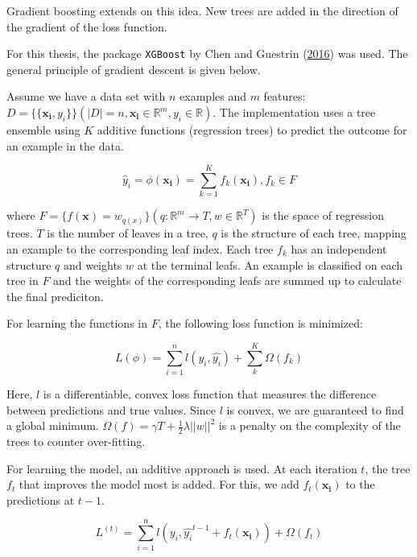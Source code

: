 \documentclass[
  11pt,
  a4paper,
  DIV=12,captions=tableheading,oneside]{scrbook}
\begin{document}
Gradient boosting extends on this idea. New trees are added in the direction of the gradient of the loss function.

For this thesis, the package \texttt{XGBoost} by Chen and Guestrin (\protect\hyperlink{ref-chen2016xgboost}{2016}) was used. The general principle of gradient descent is given below.

Assume we have a data set with \(n\) examples and \(m\) features: \(D = \{\{\mathbf{x_i}, y_i\}\} ( |D| = n, \mathbf{x_i} \in \mathbb{R}^m, y_i \in \mathbb{R})\). The implementation uses a tree ensemble using \(K\) additive functions (regression trees) to predict the outcome for an example in the data.

\begin{equation}
\hat{y}_i = \phi(\mathbf{x_i}) = \sum_{k=1}^K f_k(\mathbf{x_i}), f_k \in F
\label{eq:gbm-ensemble}
\end{equation}

where \(F = \{f(\mathbf{x}) = w_{q(x)}\} (q: \mathbb{R}^m \rightarrow T, w \in \mathbb{R}^T)\) is the space of regression trees. \(T\) is the number of leaves in a tree, \(q\) is the structure of each tree, mapping an example to the corresponding leaf index. Each tree \(f_k\) has an independent structure \(q\) and weights \(w\) at the terminal leafs. An example is classified on each tree in \(F\) and the weights of the corresponding leafs are summed up to calculate the final prediciton.

For learning the functions in \(F\), the following loss function is minimized:

\begin{equation}
L(\phi) = \sum_{i=1}^n l(y_i, \hat{y_i}) + \sum_k^K \Omega(f_k)
\label{eq:gbm-loss}
\end{equation}

Here, \(l\) is a differentiable, convex loss function that measures the difference between predictions and true values. Since \(l\) is convex, we are guaranteed to find a global minimum. \(\Omega(f) = \gamma T + \frac{1}{2}\lambda||w||^2\) is a penalty on the complexity of the trees to counter over-fitting.

For learning the model, an additive approach is used. At each iteration \(t\), the tree \(f_t\) that improves the model most is added. For this, we add \(f_t(\mathbf{x_i})\) to the predictions at \(t-1\).

\begin{equation}
L^{(t)} = \sum_{i=1}^n l(y_i, \hat{y_i}^{t-1} + f_t(\mathbf{x_i})) +\Omega(f_t)
\label{eq:gbm-iterate}
\end{equation}
\end{document}
